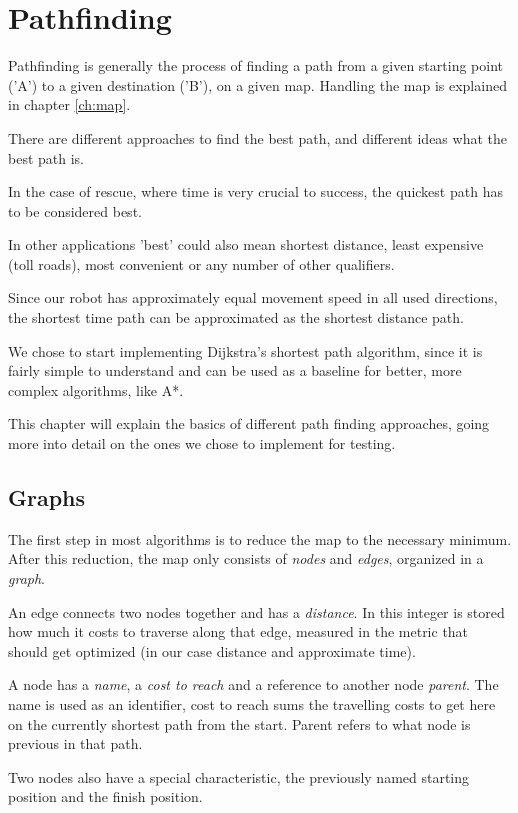 \chapter{Pathfinding}\label{ch:path}
Pathfinding is generally the process of finding a path from a given starting point ('A')
to a given destination ('B'),
on a given map.
Handling the map is explained in chapter \ref{ch:map}.

There are different approaches to find the best path,
and different ideas what the best path is.

In the case of rescue, where time is very crucial to success,
the quickest path has to be considered best. \cite{Zipes2506}

In other applications 'best' could also mean shortest distance, least expensive (toll roads),
most convenient or any number of other qualifiers.

Since our robot has approximately equal movement speed in all used directions,
the shortest time path can be approximated as the shortest distance path.

We chose to start implementing Dijkstra's shortest path algorithm,
since it is fairly simple to understand and can be used as a baseline for better,
more complex algorithms, like A*.

This chapter will explain the basics of different path finding approaches,
going more into detail on the ones we chose to implement for testing.

\section{Graphs}
The first step in most algorithms is to reduce the map to the necessary minimum.
After this reduction, the map only consists of \emph{nodes} and \emph{edges},
organized in a \emph{graph}.

An edge connects two nodes together and has a \emph{distance}.
In this integer is stored how much it costs to traverse along that edge,
measured in the metric that should get optimized (in our case distance and approximate time).

A node has a \emph{name}, a \emph{cost to reach} and a reference to another node \emph{parent}.
The name is used as an identifier,
cost to reach sums the travelling costs to get here on the currently shortest path from the start.
Parent refers to what node is previous in that path.

Two nodes also have a special characteristic,
the previously named starting position and the finish position.


